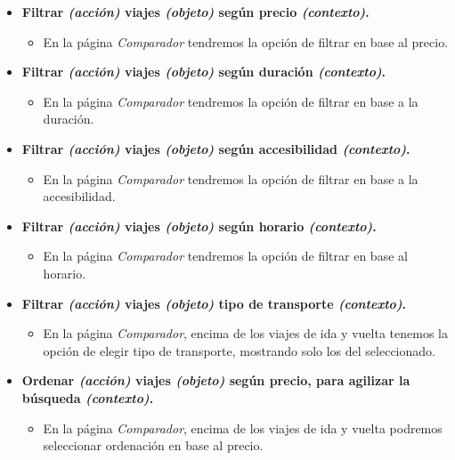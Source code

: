 \begin{itemize}
    \item \textbf{Filtrar \textit{(acción)} viajes \textit{(objeto)} según precio \textit{(contexto)}.}
        \begin{itemize}
            \item En la página \textit{Comparador} tendremos la opción de filtrar en base al precio.
        \end{itemize}

    \item \textbf{Filtrar \textit{(acción)} viajes \textit{(objeto)} según duración \textit{(contexto)}.}
        \begin{itemize}
            \item En la página \textit{Comparador} tendremos la opción de filtrar en base a la duración.
        \end{itemize}

    \item \textbf{Filtrar \textit{(acción)} viajes \textit{(objeto)} según accesibilidad \textit{(contexto)}.}
        \begin{itemize}
            \item En la página \textit{Comparador} tendremos la opción de filtrar en base a la accesibilidad.
        \end{itemize}

    \item \textbf{Filtrar \textit{(acción)} viajes \textit{(objeto)} según horario \textit{(contexto)}.}
        \begin{itemize}
            \item En la página \textit{Comparador} tendremos la opción de filtrar en base al horario.
        \end{itemize}

    \item \textbf{Filtrar \textit{(acción)} viajes \textit{(objeto)} tipo de transporte \textit{(contexto)}.}
        \begin{itemize}
            \item En la página \textit{Comparador}, encima de los viajes de ida y vuelta tenemos la opción de elegir tipo de transporte, mostrando solo los del seleccionado.
        \end{itemize}

    \item \textbf{Ordenar \textit{(acción)} viajes \textit{(objeto)} según precio, para agilizar la búsqueda \textit{(contexto)}.}
        \begin{itemize}
            \item En la página \textit{Comparador}, encima de los viajes de ida y vuelta podremos seleccionar ordenación en base al precio.
        \end{itemize}


\end{itemize}
